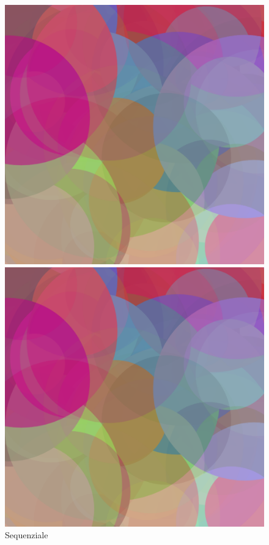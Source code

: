 \documentclass[11pt]{article}
\begin{document}
    \begin{figure}[h!]
        \begin{minipage}{0.32\textwidth}
            \centering
            \includegraphics[width=\textwidth]{img/seq/10000}
            \caption{Sequenziale}
        \end{minipage}%
        \hfill
        \begin{minipage}{0.32\textwidth}
            \centering
            \includegraphics[width=\textwidth]{img/par/10000}

\end{minipage}
\end{figure}
\end{document}
